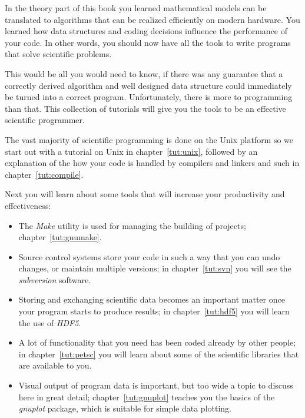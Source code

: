 
In the theory part of this book you learned mathematical models can be
translated to algorithms that can be realized efficiently on modern
hardware. You learned how data structures and coding decisions
influence the performance of your code. In other words, you should now
have all the tools to write programs that solve scientific problems.

This would be all you would need to know,
if there was any guarantee that a correctly derived algorithm and
well designed data structure could immediately be turned into a
correct program.
Unfortunately, there is more to programming than that. This collection
of tutorials will give you the tools to be an effective scientific
programmer.

The vast majority of
scientific programming is done on the Unix platform so we start out
with a tutorial on Unix in chapter~\ref{tut:unix}, followed by an
explanation of the how your code is handled by compilers and linkers
and such in chapter~\ref{tut:compile}.

Next you will learn about some tools that will increase your
productivity and effectiveness: 
\begin{itemize}
\item The \emph{Make} utility is used for managing the building of
  projects; chapter~\ref{tut:gnumake}.
\item Source control systems store your code in such a way that you
  can undo changes, or maintain multiple versions; in
  chapter~\ref{tut:svn} you will see the \emph{subversion} software.
\item Storing and exchanging scientific data becomes an important
  matter once your program starts to produce results; in
  chapter~\ref{tut:hdf5} you will learn the use of \emph{HDF5}.
\item A lot of functionality that you need has been coded already by
  other people; in chapter~\ref{tut:petsc} you will learn about some
  of the scientific libraries that are available to you.
\item Visual output of program data is important, but too wide a topic
  to discuss here in great detail; chapter~\ref{tut:gnuplot} teaches
  you the basics of the \emph{gnuplot} package, which is suitable for
  simple data plotting.
\end{itemize}

